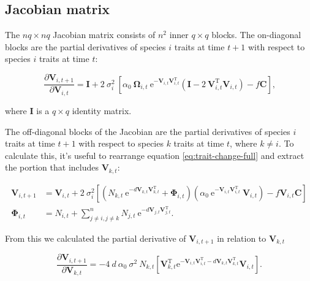 \subsection*{Jacobian matrix}

The $nq \times nq$ Jacobian matrix consists of $n^2$ inner $q \times q$ blocks.
The on-diagonal blocks are the partial derivatives of species $i$ traits at time $t+1$ with respect
to species $i$ traits at time $t$:

$$
    \frac{ \partial \mathbf{V}_{i,t+1} }{ \partial \mathbf{V}_{i,t} } = \mathbf{I} + 2 ~ \sigma_i^2 ~
        \left[
            \alpha_0 ~ \mathbf{\Omega}_{i,t} ~ \textrm{e}^{ - \mathbf{V}_{i,t} \mathbf{V}_{i,t}^{\textrm{T}} }
            \left(
                \mathbf{I} - 2 ~ \mathbf{V}_{i,t}^{\textrm{T}} \mathbf{V}_{i,t}
            \right) -
            f \mathbf{C}
        \right]
    \textrm{,}
$$

\noindent where $\mathbf{I}$ is a $q \times q$ identity matrix.


The off-diagonal blocks of the Jacobian are the partial derivatives of species $i$
traits at time $t+1$ with respect to species $k$ traits at time $t$, where $k \ne i$.
To calculate this, it's useful to rearrange equation \ref{eq:trait-change-full} and
extract the portion that includes $\mathbf{V}_{k,t}$:

\begin{equation*}
\begin{split}
    \mathbf{V}_{i,t+1} &= \mathbf{V}_{i,t} + 2 ~ \sigma_i^2
    \left[
        \left(
            N_{k,t} ~ \textrm{e}^{-d \mathbf{V}_{k,t} \mathbf{V}_{k,t}^\textrm{T}} +
            \mathbf{\Phi}_{i,t}
        \right)
        \left(
            \alpha_0 ~ \textrm{e}^{-\mathbf{V}_{i,t}
            \mathbf{V}_{i,t}^\textrm{T}} ~ \mathbf{V}_{i,t}
        \right)
        - f \mathbf{V}_{i,t} \mathbf{C}
    \right] \\
    \mathbf{\Phi}_{i,t} &= N_{i,t} + \sum_{j \ne i, j \ne k}^{n}{
        N_{j,t} ~ \textrm{e}^{-d \mathbf{V}_{j,t}
        \mathbf{V}_{j,t}^{\textrm{T}}} }
    \textrm{.}
\end{split}
\end{equation*}

From this we calculated the partial derivative of $\mathbf{V}_{i,t+1}$ in relation to $\mathbf{V}_{k,t}$

$$
    \frac{ \partial\mathbf{V}_{i,t+1} }{ \partial\mathbf{V}_{k,t}} =
        -4 ~ d ~ \alpha_0 ~ \sigma^2 ~ N_{k,t}
        \left[
            \mathbf{V}_{k,t}^{\textrm{T}}
            \textrm{e}^{
                - \mathbf{V}_{i,t} \mathbf{V}_{i,t}^{\textrm{T}}
                - d \mathbf{V}_{k,t} \mathbf{V}_{k,t}^{\textrm{T}}
            }
            \mathbf{V}_{i,t}
        \right]
    \textrm{.}
$$


